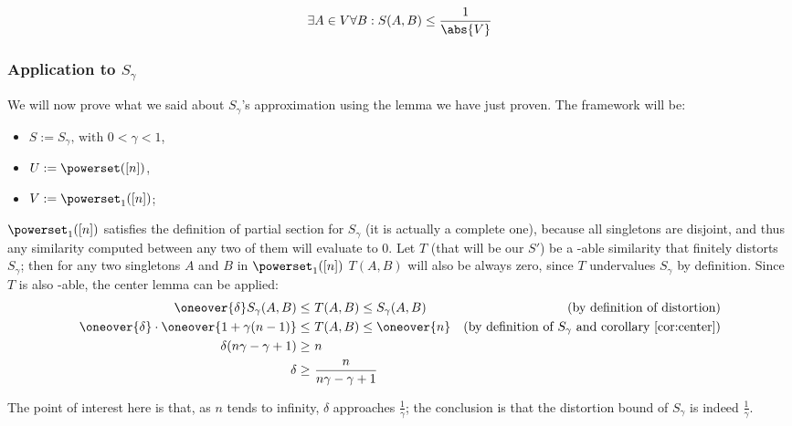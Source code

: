 \begin{corollary}\label{cor:center}
    \[
        \exists A \in V \forall B: S(A, B) \leq \frac{1}{\abs{V}}
    \]
\end{corollary}


\subsubsection{Application to $S_\gamma$}

    
We will now prove what we said about $S_\gamma$'s approximation using the lemma we have just proven. The framework will be:

\begin{itemize}
    \item $S := S_\gamma \text{, with } 0 < \gamma < 1$,
    \item $U := \powerset([n])$,
    \item $V := \powerset_1([n])$;
\end{itemize}

$\powerset_1([n])$ satisfies the definition of partial section for $S_\gamma$ (it is actually a complete one), because all singletons are disjoint, and thus any similarity computed between any two of them will evaluate to 0. Let $T$ (that will be our $S'$) be a \lsh-able similarity that finitely distorts $S_\gamma$; then for any two singletons $A$ and $B$ in $\powerset_1([n])$ $T(A, B)$ will also be always zero, since $T$ undervalues $S_\gamma$ by definition. Since $T$ is also \lsh-able, the center lemma can be applied:
\begin{align*}
    \oneover{\delta} S_\gamma(A, B)                     \leq&\ T(A, B) \leq S_\gamma(A, B)      & \text{(by definition of distortion)}\\
    \oneover{\delta} \cdot \oneover{1 + \gamma (n - 1)} \leq&\ T(A, B) \leq \oneover{n}         & \text{(by definition of $S_\gamma$ and corollary \ref{cor:center})} \\
    \delta (n \gamma - \gamma + 1)                      \geq&\ n                                & \\
    \delta                                              \geq&\ \frac{n}{n \gamma - \gamma + 1}  &
\end{align*}

The point of interest here is that, as $n$ tends to infinity, $\delta$ approaches $\frac{1}{\gamma}$; the conclusion is that the distortion bound of $S_\gamma$ is indeed $\frac{1}{\gamma}$.


